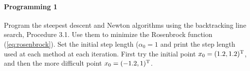 \paragraph{Programming 1}
Program the steepest descent and Newton algorithms using the backtracking line
search, Procedure 3.1. Use them to minimize the Rosenbrock function
(\ref{eq:rosenbrock}). Set the initial step length ($\alpha_0=1$ and print the
step length used at each method at each iteration. First try the initial point
$x_0=(1.2, 1.2)^{\text{\upshape T}}$, and then the more difficult point $x_0=(-1.2, 1)^{\text{\upshape T}}$.



